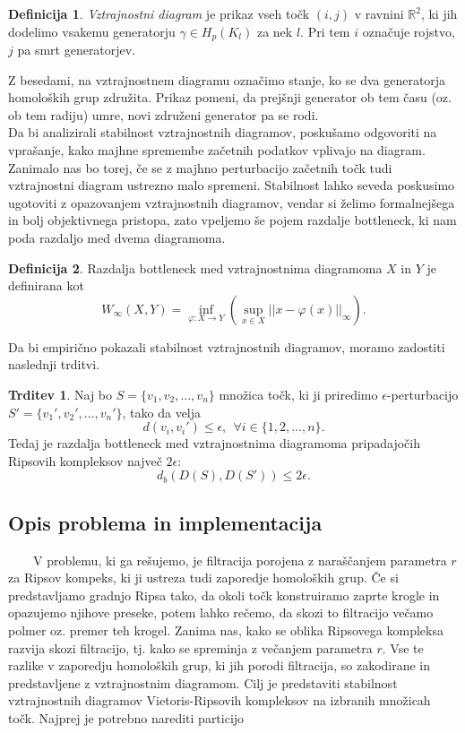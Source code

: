 \documentclass[a4paper,11pt]{article}
\theoremstyle{definition}
\newtheorem*{definicija}{Definicija}
\newtheorem*{trditev}{Trditev}
\theoremstyle{plain}
\begin{document}
\begin{definicija}
    \textit{Vztrajnostni diagram} je prikaz vseh točk $(i, j)$ v ravnini $\mathbb{R}^2$, ki jih dodelimo vsakemu generatorju $\gamma \in H_p(K_l)$ za nek $l$. Pri tem $i$ označuje rojstvo, $j$ pa smrt generatorjev.
\end{definicija}
\noindent
Z besedami, na vztrajnostnem diagramu označimo stanje, ko se dva generatorja homoloških grup združita. 
Prikaz pomeni, da prejšnji generator ob tem času (oz. ob tem radiju) umre, novi združeni generator pa se rodi. 
\\

Da bi analizirali stabilnost vztrajnostnih diagramov, poskušamo odgovoriti na vprašanje, kako majhne spremembe začetnih podatkov vplivajo na diagram.
Zanimalo nas bo torej, če se z majhno perturbacijo začetnih točk tudi vztrajnostni diagram ustrezno malo spremeni.
Stabilnost lahko seveda poskusimo ugotoviti z opazovanjem vztrajnostnih diagramov, vendar si želimo formalnejšega in bolj objektivnega pristopa, 
zato vpeljemo še pojem razdalje bottleneck, ki nam poda razdaljo med dvema diagramoma.

\begin{definicija}
    Razdalja bottleneck med vztrajnostnima diagramoma $X$ in $Y$ je definirana kot
    \[
    W_{\infty}(X, Y) = \inf_{\varphi: X \rightarrow Y} \left( \sup_{x \in X} || x - \varphi(x) ||_{\infty} \right).
    \]
\end{definicija}
\noindent
Da bi empirično pokazali stabilnost vztrajnostnih diagramov, moramo zadostiti naslednji trditvi.

\begin{trditev}
    Naj bo $S = \{v_1, v_2, \ldots, v_n \}$ množica točk, ki ji priredimo $\epsilon$-perturbacijo $S' = \{v_1', v_2', \ldots, v_n' \}$, tako da velja
    $$
    d(v_i, v_i') \leq \epsilon, \ \ \forall i \in \{1, 2, \ldots, n \}.
    $$
    Tedaj je razdalja bottleneck med vztrajnostnima diagramoma pripadajočih Ripsovih kompleksov največ $2 \epsilon$:
    $$
    d_b(D(S), D(S')) \leq 2 \epsilon.
    $$
\end{trditev}


\subsection{Opis problema in implementacija}
\ \ \ \
V problemu, ki ga rešujemo, je filtracija porojena z naraščanjem parametra $r$ za Ripsov kompeks, ki ji ustreza tudi zaporedje homoloških grup.
Če si predstavljamo gradnjo Ripsa tako, da okoli točk konstruiramo zaprte krogle in opazujemo njihove preseke, potem lahko rečemo, da skozi to filtracijo večamo polmer oz. premer teh krogel.
Zanima nas, kako se oblika Ripsovega kompleksa razvija skozi filtracijo, tj. kako se spreminja z večanjem parametra $r$. 
Vse te razlike v zaporedju homoloških grup, ki jih porodi filtracija, so zakodirane in predstavljene z vztrajnostnim diagramom. 
Cilj je predstaviti stabilnost vztrajnostnih diagramov Vietoris-Ripsovih kompleksov na izbranih množicah točk.
Najprej je potrebno narediti particijo
\end{document}
